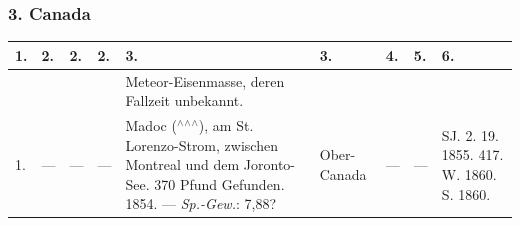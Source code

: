 \documentclass[a4paper, 8pt, oneside, polutonikogreek, german]{article}
\begin{document}
\subsubsection{3. Canada}
\begin{table}[H]
    \centering
    \footnotesize
    \begin{longtable}{|p{3mm}|p{4mm}|p{11mm}|p{7mm}|p{22mm}|p{14mm}|p{10mm}|p{10mm}|p{13mm}|}
    \hline
        1. & 2. & 2. & 2. & 3. & 3. & 4. & 5. & 6. \\ \hline
          &   &   &   & Meteor-Eisenmasse, deren Fallzeit unbekannt. &   &   &   &   \\ \hline
        1. & --- & --- & --- & Madoc ($^\wedge$$^\wedge$$^\wedge$), am St. Lorenzo-Strom, zwischen Montreal und dem Joronto-See. 370 Pfund Gefunden. 1854. --- \emph{Sp.-Gew.}: 7,88? & Ober-Canada & --- & --- & SJ. 2. 19. 1855. 417. W. 1860. S. 1860. \\ \hline
    \end{longtable}
\end{table}
\end{document}
